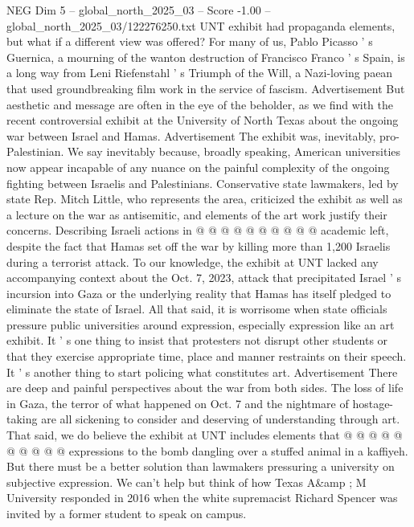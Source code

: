 \begin{textsample}{NEG Dim 5 – global\_north\_2025\_03 – Score -1.00 – global\_north\_2025\_03/122276250.txt}  \label{ex:f5_neg_257}
UNT exhibit had propaganda elements, but what if a different view was offered?
For many of us, Pablo Picasso ' s Guernica, a mourning of the wanton destruction of Francisco Franco ' s Spain, is a long way from Leni Riefenstahl ' s Triumph of the Will, a Nazi-loving paean that used groundbreaking film work in the service of fascism.
Advertisement But aesthetic and message are often in the eye of the beholder, as we find with the recent controversial exhibit at the University of North Texas about the ongoing war between Israel and Hamas.
Advertisement The exhibit was, inevitably, pro-Palestinian.
We say inevitably because, broadly speaking, American universities now appear incapable of any nuance on the painful complexity of the ongoing fighting between Israelis and Palestinians.
Conservative state lawmakers, led by state Rep.
Mitch Little, who represents the area, criticized the exhibit as well as a lecture on the war as antisemitic, and elements of the art work justify their concerns.
Describing Israeli actions in @ @ @ @ @ @ @ @ @ @ academic left, despite the fact that Hamas set off the war by killing more than 1,200 Israelis during a terrorist attack.
To our knowledge, the exhibit at UNT lacked any accompanying context about the Oct. 7, 2023, attack that precipitated Israel ' s incursion into Gaza or the underlying reality that Hamas has itself pledged to eliminate the state of Israel.
All that said, it is worrisome when state officials pressure public universities around expression, especially expression like an art exhibit.
It ' s one thing to insist that protesters not disrupt other students or that they exercise appropriate time, place and manner restraints on their speech.
It ' s another thing to start policing what constitutes art.
Advertisement There are deep and painful perspectives about the war from both sides.
The loss of life in Gaza, the terror of what happened on Oct. 7 and the nightmare of hostage-taking are all sickening to consider and deserving of understanding through art.
That said, we do believe the exhibit at UNT includes elements that @ @ @ @ @ @ @ @ @ @ expressions to the bomb dangling over a stuffed animal in a kaffiyeh.
But there must be a better solution than lawmakers pressuring a university on subjective expression.
We can't help but think of how Texas A\&amp ; M University responded in 2016 when the white supremacist Richard Spencer was invited by a former student to speak on campus.

\end{textsample}
